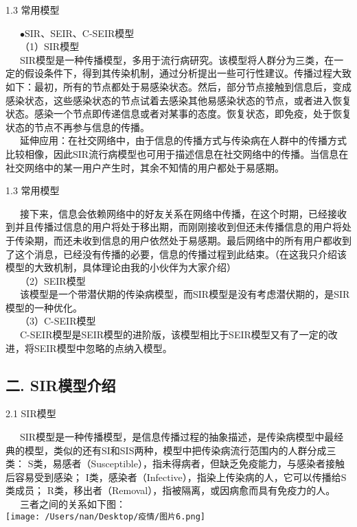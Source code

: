 \documentclass[
  ignorenonframetext,
]{beamer}
\begin{document}
\begin{frame}{1.3 常用模型}
\protect\hypertarget{section-4}{}

  \(\bullet\)SIR、SEIR、C-SEIR模型\\
  （1）SIR模型\\
  SIR模型是一种传播模型，多用于流行病研究。该模型将人群分为三类，在一定的假设条件下，得到其传染机制，通过分析提出一些可行性建议。传播过程大致如下：最初，所有的节点都处于易感染状态。然后，部分节点接触到信息后，变成感染状态，这些感染状态的节点试着去感染其他易感染状态的节点，或者进入恢复状态。感染一个节点即传递信息或者对某事的态度。恢复状态，即免疫，处于恢复状态的节点不再参与信息的传播。\\
  延伸应用：在社交网络中，由于信息的传播方式与传染病在人群中的传播方式比较相像，因此SIR流行病模型也可用于描述信息在社交网络中的传播。当信息在社交网络中的某一用户产生时，其余不知情的用户都处于易感期。

\end{frame}

\begin{frame}{1.3 常用模型}
\protect\hypertarget{section-5}{}

  接下来，信息会依赖网络中的好友关系在网络中传播，在这个时期，已经接收到并且传播过信息的用户将处于移出期，而刚刚接收到但还未传播信息的用户将处于传染期，而还未收到信息的用户依然处于易感期。最后网络中的所有用户都收到了这个消息，已经没有传播的必要，信息的传播过程到此结束。（在这我只介绍该模型的大致机制，具体理论由我的小伙伴为大家介绍）\\
  （2）SEIR模型\\
  该模型是一个带潜伏期的传染病模型，而SIR模型是没有考虑潜伏期的，是SIR模型的一种优化。\\
  （3）C-SEIR模型\\
  C-SEIR模型是SEIR模型的进阶版，该模型相比于SEIR模型又有了一定的改进，将SEIR模型中忽略的点纳入模型。

\end{frame}

\hypertarget{sir}{%
\subsection{二. SIR模型介绍}\label{sir}}

\begin{frame}{2.1 SIR模型}
\protect\hypertarget{sir-1}{}

  SIR模型是一种传播模型，是信息传播过程的抽象描述，是传染病模型中最经典的模型，类似的还有SI和SIS两种，模型中把传染病流行范围内的人群分成三类：
S类，易感者（Susceptible），指未得病者，但缺乏免疫能力，与感染者接触后容易受到感染；
I类，感染者（Infective），指染上传染病的人，它可以传播给S类成员；
R类，移出者（Removal），指被隔离，或因病愈而具有免疫力的人。\\
  三者之间的关系如下图：\\
\texttt{[image: /Users/nan/Desktop/疫情/图片6.png]}

\end{frame}
\end{document}
